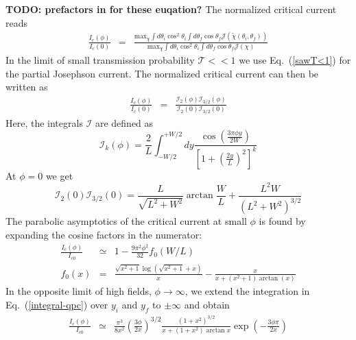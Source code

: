 \documentclass[a4paper]{article}
\begin{document}
\textbf{TODO: prefactors in for these euqation?}
The normalized critical current reads
\begin{eqnarray}
\frac{I_c(\phi)}{I_c(0)} &=& \frac{ \text{max}_{\chi} \int d \theta_i \cos^2 \theta_i\int d \theta_f \cos \theta_f \mathcal{J}(\tilde{\chi}(\theta_i, \theta_f)) }{ \text{max}_{\chi} \int d \theta_i \cos^2 \theta_i\int d \theta_f \cos \theta_f \mathcal{J}(\chi) }
\end{eqnarray}
In the limit of small transmission probability $\mathcal{T} << 1$ we use Eq.~(\ref{sawT<1}) for the partial Josephson current. The normalized critical current can then be written as 
\begin{eqnarray}
\frac{I_c(\phi)}{I_c(0)} &=& \frac{\mathcal{I}_2(\phi)\mathcal{I}_{3/2}(\phi)}{\mathcal{I}_2(0)\mathcal{I}_{3/2}(0)}
\end{eqnarray}
Here, the integrals $\mathcal{I}$ are defined as
\begin{equation}
\mathcal{I}_k(\phi) = \frac{2}{L}\int_{-W/2}^{+W/2}dy \frac{\cos\left(\frac{3\pi\phi y}{2W}\right)}{\left[1 + \left(\frac{2y}{L}\right)^2 \right]^k}
\label{integral-qpc}
\end{equation}
At $\phi=0$ we get
\begin{equation}
\mathcal{I}_2(0)\mathcal{I}_{3/2}(0) =
\frac{L}{\sqrt{L^2+W^2}}\arctan\frac{W}{L} + \frac{L^2W}{(L^2+W^2)^{3/2}}
\label{Ic-0}
\end{equation}
The parabolic asymptotics of the critical current at small $\phi$ is found by expanding
the cosine factors in the numerator:
\begin{eqnarray}
\frac{I_c(\phi)}{I_{c0}}&\simeq& 1 - \frac{9\pi ^2 \phi^2 }{32} f_0(W/L) \\
f_0(x) &=& \frac{\sqrt{x^2+1} \log \left(\sqrt{x^2+1}+x\right)}{x}- \frac{x}{x+\left(x^2+1\right) \arctan(x)} 
\end{eqnarray}
In the opposite limit of high fields, $\phi\to \infty$, we extend the integration in Eq.~(\ref{integral-qpc}) over $y_i$ and $y_f$
to $\pm \infty$ and obtain
\begin{eqnarray}
\frac{I_c(\phi)}{I_{c0}} &\simeq& \frac{\pi^3 }{8x^2}\left(\frac{3\phi}{2x}\right)^{3/2}\frac{\left(1+x^2\right)^{3/2}}{x + \left(1+x^2\right)\arctan x}\exp\left(-\frac{3\phi\pi}{2x}\right)
\label{large-phi}
\end{eqnarray}
\end{document}
